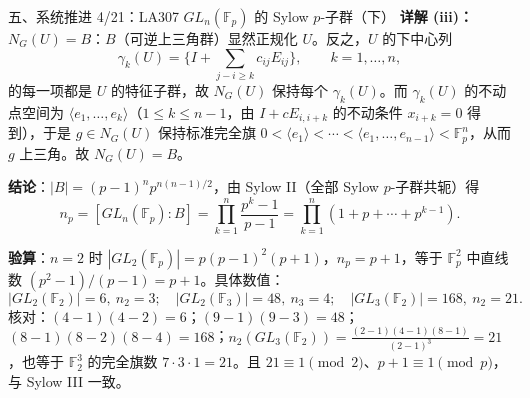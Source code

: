 \documentclass[aspectratio=169,10pt,fontset=none]{ctexbeamer}
\newcommand{\key}[1]{\textcolor{ink}{\bfseries #1}}
\begin{document}
\begin{frame}[t]{五、系统推进 4/21：LA307 $GL_n(\mathbb F_p)$ 的 Sylow $p$-子群（下）}
\scriptsize
\key{详解 (iii)：$N_G(U)=B$}：$B$（可逆上三角群）显然正规化 $U$。反之，$U$ 的下中心列
\[ \gamma_k(U)=\{I+\textstyle\sum_{j-i\ge k}c_{ij}E_{ij}\},\qquad k=1,\dots,n, \]
的每一项都是 $U$ 的特征子群，故 $N_G(U)$ 保持每个 $\gamma_k(U)$。而 $\gamma_k(U)$ 的不动点空间为 $\langle e_1,\dots,e_k\rangle$（$1\le k\le n-1$，由 $I+cE_{i,i+k}$ 的不动条件 $x_{i+k}=0$ 得到），于是 $g\in N_G(U)$ 保持标准完全旗 $0<\langle e_1\rangle<\cdots<\langle e_1,\dots,e_{n-1}\rangle<\mathbb F_p^n$，从而 $g$ 上三角。故 $N_G(U)=B$。

\key{结论}：$|B|=(p-1)^n p^{n(n-1)/2}$，由 Sylow II（全部 Sylow $p$-子群共轭）得
\[ n_p=[GL_n(\mathbb F_p):B]=\prod_{k=1}^{n}\frac{p^k-1}{p-1}=\prod_{k=1}^{n}(1+p+\cdots+p^{k-1}). \]

\key{验算}：$n=2$ 时 $|GL_2(\mathbb F_p)|=p(p-1)^2(p+1)$，$n_p=p+1$，等于 $\mathbb F_p^2$ 中直线数 $(p^2-1)/(p-1)=p+1$。具体数值：
\[ |GL_2(\mathbb F_2)|=6,\ n_2=3;\quad |GL_2(\mathbb F_3)|=48,\ n_3=4;\quad |GL_3(\mathbb F_2)|=168,\ n_2=21. \]
核对：$(4-1)(4-2)=6$；$(9-1)(9-3)=48$；$(8-1)(8-2)(8-4)=168$；$n_2(GL_3(\mathbb F_2))=\frac{(2-1)(4-1)(8-1)}{(2-1)^3}=21$，也等于 $\mathbb F_2^3$ 的完全旗数 $7\cdot3\cdot1=21$。且 $21\equiv1\pmod2$、$p+1\equiv1\pmod p$，与 Sylow III 一致。
\end{frame}
\end{document}
